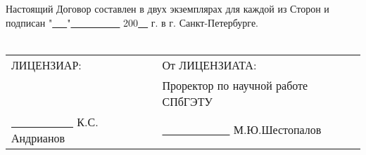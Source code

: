 Настоящий Договор составлен в двух экземплярах для каждой из Сторон и подписан "\underline{\ \ \ }"\underline{\ \ \ \ \ \ \ \ \ \ } 200\underline{\ \ } г. в г. Санкт-Петербурге.
\\
\\

\begin{tabular}{p{20em}p{20em}}
    ЛИЦЕНЗИАР: &   От ЛИЦЕНЗИАТА: \\
     & Проректор по научной работе СПбГЭТУ \\
    \underline{\ \ \ \ \ \ \ \ \ \ \ }  К.С. Андрианов & 	

            \underline{\ \ \ \ \ \ \ \ \ \ \ \ } М.Ю.Шестопалов
            \\
\end{tabular}
